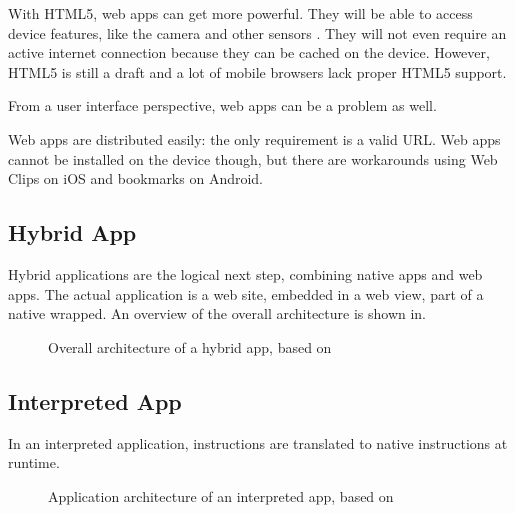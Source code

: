 \npar With HTML5, web apps can get more powerful. They will be able to access device features, like the camera and other sensors \citep{MobileHTML5}. They will not even require an active internet connection because they can be cached on the device. However, HTML5 is still a draft and a lot of mobile browsers lack proper HTML5 support.

\npar From a user interface perspective, web apps can be a problem as well. %

\npar Web apps are distributed easily: the only requirement is a valid URL. Web apps cannot be installed on the device though, but there are workarounds using Web Clips on iOS \citep{Safari:webclips} and bookmarks on Android. 

\subsection{Hybrid App}

\npar Hybrid applications are the logical next step, combining native apps and web apps. The actual application is a web site, embedded in a web view, part of a native wrapped. An overview of the overall architecture is shown in. 

\begin{figure}
    \begin{center}
        \caption{
            Overall architecture of a hybrid app, based on \citep{Friese}
        }
        \label{fig:hybrid}
    \end{center}
\end{figure}

\npar

\subsection{Interpreted App}

\npar In an interpreted application, instructions are translated to native instructions at runtime.

\begin{figure}
    \begin{center}
        \caption{
            Application architecture of an interpreted app, based on \citep{Friese}
        }
        \label{fig:interpreted}
    \end{center}
\end{figure}

